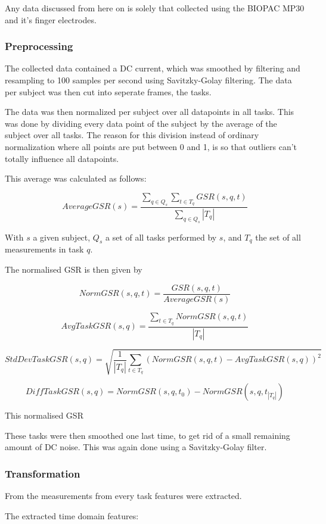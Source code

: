 \documentclass[12pt,fleqn,leqno,letterpaper]{article}
\begin{document}
Any data discussed from here on is solely that collected using the BIOPAC MP30 and it's finger electrodes.


\subsubsection{Preprocessing}
The collected data contained a DC current, which was smoothed by filtering and resampling to 100 samples per second using Savitzky-Golay filtering. 
The data per subject was then cut into seperate frames, the tasks. 

The data was then normalized per subject over all datapoints in all tasks. This was done by dividing every data point of the subject by the average of the subject over all tasks. The reason for this division instead of ordinary normalization where all points are put between 0 and 1, is so that outliers can't totally influence all datapoints.

This average was calculated as follows:


\[
AverageGSR(s) = \frac 
{\sum_{q \in Q_s}\sum_{t \in T_q} GSR(s,q,t)}
{ \sum_{q \in Q_s} \left\vert{T_q}\right\vert }
\]

With $s$ a given subject, $Q_s$ a set of all tasks performed by $s$, and $T_q$ the set of all measurements in task $q$.

The normalised GSR is then given by

\[
NormGSR(s,q,t) = \frac{GSR(s,q,t)}{AverageGSR(s)}
\]




\[
AvgTaskGSR(s,q) = \frac { \sum_{t \in T_q} NormGSR(s,q,t) }
{\left\vert{T_q}\right\vert }
\]

\[
StdDevTaskGSR(s,q) = \sqrt {\frac{1}{\left\vert{T_q}\right\vert}   \sum_{t \in T_q} (NormGSR(s,q,t) - AvgTaskGSR(s,q))^2 }
\]

\[
DiffTaskGSR(s,q) = NormGSR(s,q, t_0) - NormGSR(s,q, t_{\left\vert{T_q}\right\vert})
\]

This normalised GSR 


These tasks were then smoothed one last time, to get rid of a small remaining amount of DC noise. This was again done using a Savitzky-Golay filter.

\subsubsection{Transformation}
From the measurements from every task features were extracted. 

The extracted time domain features:
\end{document}
